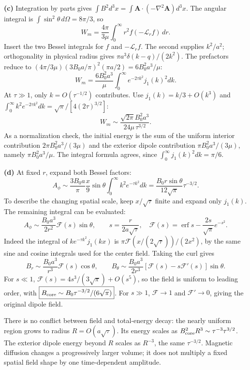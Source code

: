 \textbf{(c)} Integration by parts gives
$\int B^2d^3x=\int\mathbf A\cdot(-\nabla^2\mathbf A)d^3x$.
The angular integral is $\int\sin^2\theta\,d\Omega=8\pi/3$, so
\[
W_m=\frac{4\pi}{3\mu}\int_0^\infty r^2f(-\mathcal L_rf)\,dr.
\]
Insert the two Bessel integrals for $f$ and $-\mathcal L_rf$.
The second supplies $k^2/a^2$; orthogonality in physical radius gives
$\pi a^3\delta(k-q)/(2k^2)$.
The prefactors reduce to
$(4\pi/3\mu)(3B_0a/\pi)^2(\pi a/2)=6B_0^2a^3/\mu$:
\[
\boxed{W_m=\frac{6B_0^2a^3}{\mu}
\int_0^\infty e^{-2\tau k^2}j_1(k)^2dk.}
\]
At $\tau\gg1$, only $k=O(\tau^{-1/2})$ contributes.
Use $j_1(k)=k/3+O(k^3)$ and
$\int_0^\infty k^2e^{-2\tau k^2}dk=\sqrt\pi/[4(2\tau)^{3/2}]$:
\[
\boxed{W_m\sim\frac{\sqrt{2\pi}B_0^2a^3}{24\mu\,\tau^{3/2}}.}
\]
As a normalization check, the initial energy is the sum of the uniform
interior contribution $2\pi B_0^2a^3/(3\mu)$ and the exterior dipole
contribution $\pi B_0^2a^3/(3\mu)$, namely $\pi B_0^2a^3/\mu$.
The integral formula agrees, since $\int_0^\infty j_1(k)^2dk=\pi/6$.

\textbf{(d)} At fixed $r$, expand both Bessel factors:
\[
A_\phi\sim\frac{3B_0a}{\pi}\frac{x}{9}\sin\theta
\int_0^\infty k^2e^{-\tau k^2}dk
=\boxed{\frac{B_0r\sin\theta}{12\sqrt\pi}\tau^{-3/2}.}
\]
To describe the changing spatial scale, keep $x/\sqrt\tau$ finite
and expand only $j_1(k)$. The remaining integral can be evaluated:
\[
A_\phi\sim\frac{B_0a^3}{2r^2}\mathcal F(s)\sin\theta,\qquad
s=\frac{r}{2a\sqrt\tau},\quad
\mathcal F(s)=\operatorname{erf}s-\frac{2s}{\sqrt\pi}e^{-s^2}.
\]
Indeed the integral of $ke^{-\tau k^2}j_1(kx)$ is
$\pi\mathcal F(x/(2\sqrt\tau))/(2x^2)$, by the same sine and cosine
integrals used for the center field.
Taking the curl gives
\[
B_r\sim\frac{B_0a^3}{r^3}\mathcal F(s)\cos\theta,\qquad
B_\theta\sim\frac{B_0a^3}{2r^3}
[\mathcal F(s)-s\mathcal F'(s)]\sin\theta.
\]
For $s\ll1$, $\mathcal F(s)=4s^3/(3\sqrt\pi)+O(s^5)$, so the
field is uniform to leading order, with
$\boxed{B_{\rm core}\sim B_0\tau^{-3/2}/(6\sqrt\pi)}$.
For $s\gg1$, $\mathcal F\to1$ and $\mathcal F'\to0$, giving the
original dipole field.

There is no conflict between field and total-energy decay: the nearly
uniform region grows to radius $R=O(a\sqrt\tau)$.
Its energy scales as $B_{\rm core}^2R^3\sim\tau^{-3}\tau^{3/2}$.
The exterior dipole energy beyond $R$ scales as $R^{-3}$, the same
$\tau^{-3/2}$. Magnetic diffusion changes a progressively larger
volume; it does not multiply a fixed spatial field shape by one
time-dependent amplitude.


